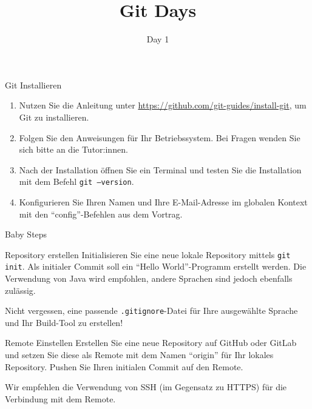\documentclass[
    english,
    accentcolor=TUDa-1c,
    fontsize= 12pt,
    a4paper,
    aspectratio=169,
    colorback=true,
    fancy_row_colors,
    boxarc=3pt,
]{algoexercise}
\title{Git Days}
\subtitle{Day 1}
\begin{document}
    \maketitle

    \begin{task}{Git Installieren}
        \begin{enumerate}
            \item Nutzen Sie die Anleitung unter \href{https://github.com/git-guides/install-git}{https://github.com/git-guides/install-git}, um Git zu installieren.
            \item Folgen Sie den Anweisungen für Ihr Betriebssystem.
            Bei Fragen wenden Sie sich bitte an die Tutor:innen.
            \item Nach der Installation öffnen Sie ein Terminal und testen Sie die Installation mit dem Befehl \texttt{git --version}.
            \item Konfigurieren Sie Ihren Namen und Ihre E-Mail-Adresse im globalen Kontext mit den \enquote{config}-Befehlen aus dem Vortrag.
        \end{enumerate}
    \end{task}

    \begin{task}{Baby Steps}
        \begin{subtask*}{Repository erstellen}
            Initialisieren Sie eine neue lokale Repository mittels \texttt{git init}.
            Als initialer Commit soll ein \enquote{Hello World}-Programm erstellt werden.
            Die Verwendung von Java wird empfohlen, andere Sprachen sind jedoch ebenfalls zulässig.

            \begin{hinweis}
                Nicht vergessen, eine passende \texttt{.gitignore}-Datei für Ihre ausgewählte Sprache und Ihr Build-Tool zu erstellen!
            \end{hinweis}

        \end{subtask*}
        \begin{subtask*}{Remote Einstellen}
            Erstellen Sie eine neue Repository auf GitHub oder GitLab und setzen Sie diese als Remote mit dem Namen \enquote{origin} für Ihr lokales Repository.
            Pushen Sie Ihren initialen Commit auf den Remote.

            \begin{hinweis}
                Wir empfehlen die Verwendung von SSH (im Gegensatz zu HTTPS) für die Verbindung mit dem Remote.
            \end{hinweis}

        \end{subtask*}
    \end{task}
\end{document}
